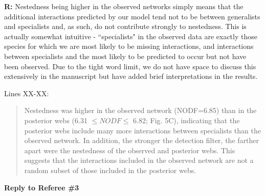 \documentclass[12pt]{letter}
\begin{document}
		\textbf{R:} Nestedness being higher in the observed networks simply means that the additional interactions predicted by our model tend not to be between generalists and specialists and, as such, do not contribute strongly to nestedness. This is actually somewhat intuitive - ``specialists" in the observed data are exactly those species for which we are most likely to be missing interactions, and interactions between specialists and the most likely to be predicted to occur but not have been observed. Due to the tight word limit, we do not have space to discuss this extensively in the manuscript but have added brief interpretations in the results.


		Lines XX-XX:


		\begin{quotation}
			Nestedness was higher in the observed network (NODF=6.85) than in the posterior webs (6.31 $\leq NODF \leq$ 6.82; Fig. 5C), indicating that the posterior webs include many more interactions between specialists than the observed network. In addition, the stronger the detection filter, the farther apart were the nestedness of the observed and posterior webs. This suggests that the interactions included in the observed network are not a random subset of those included in the posterior webs.
		\end{quotation}

\clearpage

{\Large \bf Reply to Referee \#3}
\end{document}
